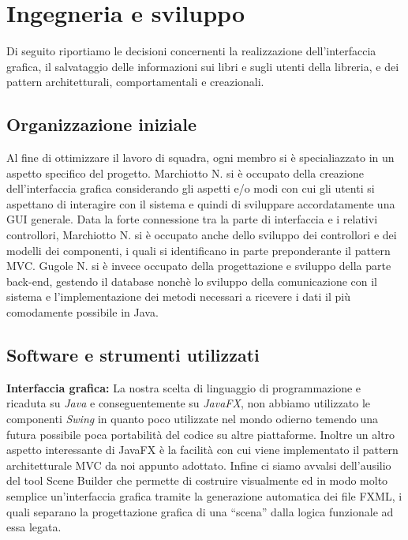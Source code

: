 \documentclass[a4paper,12pt,titlepage]{article}
\begin{document}
\cleardoublepage

\section{Ingegneria e sviluppo}\label{sec:ingegneria e sviluppo}
Di seguito riportiamo le decisioni concernenti la realizzazione dell’interfaccia grafica, il salvataggio
delle informazioni sui libri e sugli utenti della libreria, e dei pattern architetturali, comportamentali
e creazionali.

\subsection{Organizzazione iniziale}
Al fine di ottimizzare il lavoro di squadra, ogni membro si è specialiazzato in un aspetto specifico del progetto. Marchiotto N. si è occupato della creazione dell'interfaccia grafica considerando gli aspetti e/o modi con cui gli utenti si
aspettano di interagire con il sistema e quindi di sviluppare accordatamente una GUI generale. Data la forte connessione tra la parte di interfaccia e i relativi controllori, Marchiotto N. si è occupato anche dello sviluppo dei controllori e dei modelli dei componenti, i quali si identificano in parte preponderante il pattern MVC.
Gugole N. si è invece occupato della progettazione e sviluppo della parte back-end, gestendo il database nonchè lo sviluppo della comunicazione con il sistema e l'implementazione dei metodi necessari a ricevere i dati il più comodamente possibile in Java.


\subsection{Software e strumenti utilizzati}

\textbf{Interfaccia grafica: }La nostra scelta di linguaggio di programmazione e ricaduta su \textit{Java} e conseguentemente su \textit{JavaFX}, non abbiamo utilizzato le componenti \textit{Swing} in quanto poco utilizzate nel mondo odierno temendo una futura possibile poca portabilità del codice su altre piattaforme.
Inoltre un altro aspetto interessante di JavaFX è la facilità con cui viene implementato il pattern architetturale MVC
da noi appunto adottato. Infine ci siamo avvalsi dell’ausilio del tool Scene Builder che permette di costruire visualmente ed
in modo molto semplice un’interfaccia grafica tramite la generazione automatica dei file FXML, i quali separano la progettazione grafica di una “scena” dalla logica funzionale ad essa legata.\\
\end{document}

